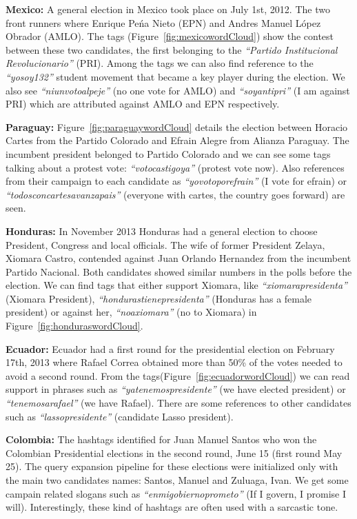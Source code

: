 \noindent	
{\bf Mexico:} A general election in Mexico took place on July 1st, 2012.
The two front runners where Enrique Pe\'{n}a Nieto (EPN) and Andres Manuel L\'{o}pez Obrador (AMLO).
The tags (Figure~\ref{fig:mexicowordCloud}) show the contest between these two candidates, the first belonging to the \emph{“Partido Institucional Revolucionario”} (PRI). 
Among the tags we can also find reference to the \emph{“yosoy132”} student movement that became a key player during the election. 
We also see \emph{“niunvotoalpeje”} (no one vote for AMLO) and \emph{“soyantipri”} (I am against PRI) which are attributed against AMLO and EPN respectively.

\noindent
{\bf Paraguay:}
Figure~\ref{fig:paraguaywordCloud} details the election between Horacio Cartes from the Partido Colorado and Efrain Alegre from Alianza Paraguay. 
The incumbent president belonged to Partido Colorado and we can see some tags talking about a protest vote: \emph{“votocastigoya”} (protest vote now). 
Also references from their campaign to each candidate as \emph{“yovotoporefrain”} (I vote for efrain) or \emph{“todosconcartesavanzapais”} (everyone with cartes, the country goes forward) are seen.

\noindent
{\bf Honduras:}
In November 2013 Honduras had a general election to choose President, Congress and local officials. 
The wife of former President Zelaya, Xiomara Castro, contended against Juan Orlando Hernandez from the incumbent Partido Nacional. 
Both candidates showed similar numbers in the polls before the election. 
We can find tags that either support Xiomara, like \emph{“xiomarapresidenta”} (Xiomara President), \emph{“hondurastienepresidenta”} (Honduras has a female president) or against her, \emph{“noaxiomara”} (no to Xiomara) in Figure~\ref{fig:honduraswordCloud}.

\noindent
{\bf Ecuador:}
Ecuador had a first round for the presidential election on February 17th, 2013 where Rafael Correa obtained more than 50\% of the votes needed to avoid a second round. 
From the tags(Figure~\ref{fig:ecuadorwordCloud}) we can read support in phrases such as \emph{“yatenemospresidente”} (we have elected president) or \emph{“tenemosarafael”} (we have Rafael). 
There are some references to other candidates such as \emph{“lassopresidente”} (candidate Lasso president).

\noindent
{\bf Colombia:}
The hashtags identified for Juan Manuel Santos who won the Colombian Presidential elections in the second round,
June 15 (first round May 25). The query expansion pipeline for these elections were initialized only with the main two candidates names: Santos, Manuel and Zuluaga, Ivan. We get some campain related slogans such as \emph{``enmigobiernoprometo''} (If I govern, I promise I will). Interestingly, these kind of hashtags are often used with a sarcastic tone.


